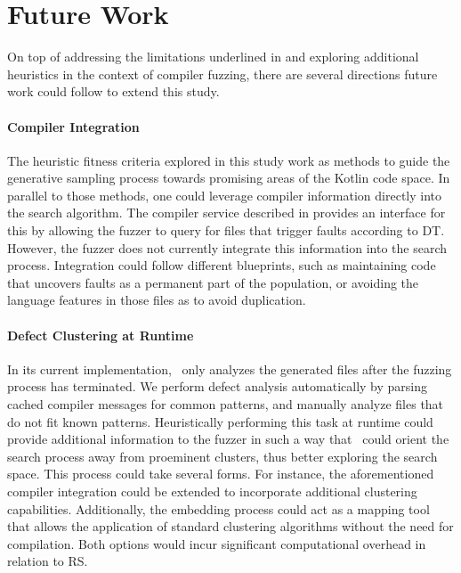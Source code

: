 \section{\label{sec:future}Future Work}

On top of addressing the limitations underlined in  and exploring
additional heuristics in the context of compiler fuzzing,
there are several directions future work could follow to extend this study.

\paragraph{Compiler Integration}
The heuristic fitness
criteria explored in this study work as methods
to guide the generative sampling process towards
promising areas of the Kotlin code space.
In parallel to those methods, one could leverage compiler information
directly into the search algorithm.
The compiler service described in  provides
an interface for this by allowing the fuzzer
to query for files that trigger faults according to \gls{DT}.
However, the fuzzer does not currently integrate this information into the search process.
Integration could follow different blueprints, such as maintaining code that uncovers faults as a permanent part of the population,
or avoiding the language features in those files as to avoid duplication.

\paragraph{Defect Clustering at Runtime}
In its current implementation, \kf~only analyzes the generated files
after the fuzzing process has terminated.
We perform defect analysis automatically by parsing cached compiler messages
for common patterns, and manually analyze files that do not fit known patterns.
Heuristically performing this task at runtime could provide additional information to the fuzzer
in such a way that \kf~could orient the search process away from proeminent clusters,
thus better exploring the search space.
This process could take several forms.
For instance, the aforementioned compiler integration could be extended
to incorporate additional clustering capabilities.
Additionally, the embedding process could act as a mapping
tool that allows the application of standard clustering algorithms
without the need for compilation.
Both options would incur significant computational overhead in relation to \gls{RS}.


